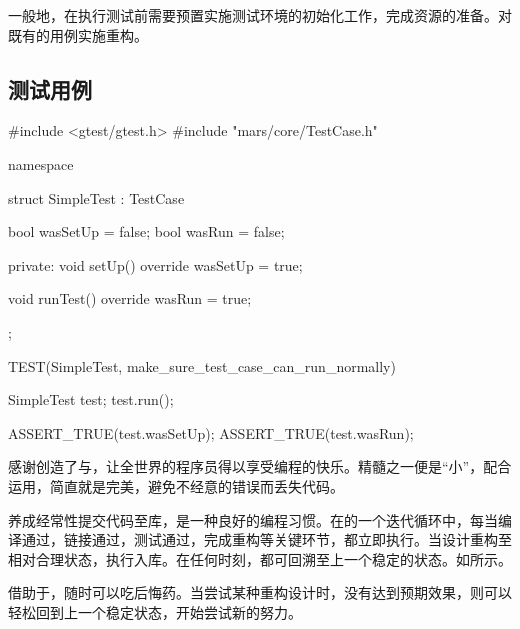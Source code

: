 \begin{content}

一般地，在执行测试前需要预置实施测试环境的初始化工作，完成资源的准备。对既有的用例实施重构。

\subsection{测试用例}

\begin{leftbar}
 \begin{c++}[caption={\ttfamily{test/mars/core/TestCaseSpec.cc}}]
#include <gtest/gtest.h>
#include "mars/core/TestCase.h"

namespace {
  struct SimpleTest : TestCase {
    bool wasSetUp = false;
    bool wasRun = false;

  private:
    void setUp() override {
      wasSetUp = true;
    }

    void runTest() override {
      wasRun = true;
    }
  };
}

TEST(SimpleTest, make_sure_test_case_can_run_normally) {
  SimpleTest test;
  test.run();

  ASSERT_TRUE(test.wasSetUp);
  ASSERT_TRUE(test.wasRun);
}
 \end{c++}
\end{leftbar}

\begin{story}
  \begin{center}
  \end{center}

\begin{content}

感谢创造了与，让全世界的程序员得以享受编程的快乐。精髓之一便是“小”，配合运用，简直就是完美，避免不经意的错误而丢失代码。

养成经常性提交代码至库，是一种良好的编程习惯。在的一个迭代循环中，每当编译通过，链接通过，测试通过，完成重构等关键环节，都立即执行。当设计重构至相对合理状态，执行入库。在任何时刻，都可回溯至上一个稳定的状态。如所示。

借助于，随时可以吃后悔药。当尝试某种重构设计时，没有达到预期效果，则可以轻松回到上一个稳定状态，开始尝试新的努力。


\end{content}
\end{story}
\end{content}
